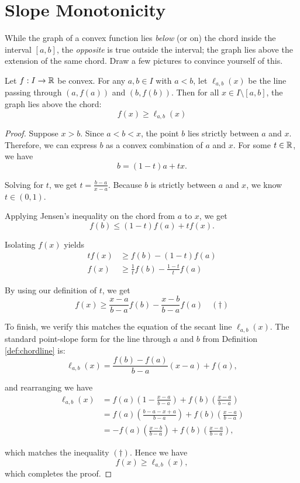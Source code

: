 \documentclass[../analysis1.tex]{subfiles}
\begin{document}
\section{Slope Monotonicity}

While the graph of a convex function lies \textit{below} (or on) the chord inside the interval $[a,b]$, the \textit{opposite} is true outside the interval; the graph lies above the extension of the same chord. Draw a few pictures to convince yourself of this.

\begin{lemma}
\label{lem:chordextension}
    \begin{shaded*}
        Let $f: I \to \mathbb{R}$ be convex. For any $a, b \in I$ with $a < b$, let $\ell_{a,b}(x)$ be the line passing through $(a, f(a))$ and $(b, f(b))$. Then for all $x \in I \setminus [a,b]$, the graph lies above the chord:
        $$ f(x) \ge \ell_{a,b}(x) $$
    \end{shaded*}
\end{lemma}

\begin{proof}
    Suppose $x > b$. Since $a < b < x$, the point $b$ lies strictly between $a$ and $x$. Therefore, we can express $b$ as a convex combination of $a$ and $x$. For some $t\in\mathbb{R}$, we have
\[ b = (1-t)a + tx. \]

Solving for $t$, we get $t = \frac{b-a}{x-a}$. Because $b$ is strictly between $a$ and $x$, we know $t \in (0, 1)$.

Applying Jensen's inequality on the chord from $a$ to $x$, we get
\[ f(b) \le (1-t)f(a) + t f(x). \]

Isolating $f(x)$ yields
\begin{align*}
t f(x) &\ge f(b) - (1-t)f(a) \\
f(x) &\ge \frac{1}{t}f(b) - \frac{1-t}{t}f(a)
\end{align*}

By using our definition of $t$, we get
\[ f(x) \ge \frac{x-a}{b-a}f(b) - \frac{x-b}{b-a}f(a) \quad (\dagger) \]

To finish, we verify this matches the equation of the secant line $\ell_{a,b}(x)$. The standard point-slope form for the line through $a$ and $b$ from Definition \ref{def:chordline} is:
\[ \ell_{a,b}(x) = \frac{f(b)-f(a)}{b-a}(x-a) + f(a), \]

and rearranging we have
\begin{align*}
\ell_{a,b}(x) &= f(a)\left(1 - \frac{x-a}{b-a}\right) + f(b)\left(\frac{x-a}{b-a}\right) \\
&= f(a)\left(\frac{b-a - x + a}{b-a}\right) + f(b)\left(\frac{x-a}{b-a}\right) \\
&= -f(a)\left(\frac{x-b}{b-a}\right) + f(b)\left(\frac{x-a}{b-a}\right),
\end{align*}

which matches the inequality $(\dagger)$. Hence we have
\[ f(x) \ge \ell_{a,b}(x), \]
which completes the proof.\qedhere
\end{proof}
\end{document}
